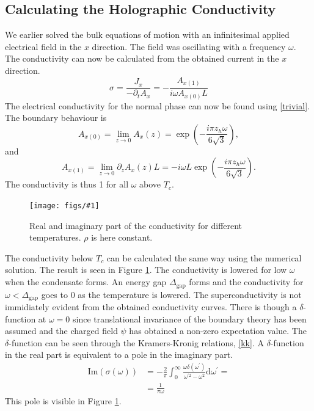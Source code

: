 \documentclass[12pt]{report}
\renewcommand{\d}{\ensuremath{\mathrm{d}}}
\renewcommand{\i}{\ensuremath{i}}
\newcommand{\im}{\ensuremath{\mathrm{Im}}}
\newcommand{\fig}[2]{
\begin{figure}
\centering
\texttt{[image: figs/\#1]}
\caption{#2}
\end{figure}
}
\begin{document}
\subsection{Calculating the Holographic Conductivity}
We earlier solved the bulk equations of motion with an infinitesimal applied electrical field in the $x$ direction. The field was oscillating with a frequency $\omega$. The conductivity can now be calculated from the obtained current in the $x$ direction.
\begin{equation}
 \sigma=\frac{J_x}{-\partial_tA_x}=-\frac{A_{x(1)}}{\i\omega A_{x(0)}L}
\end{equation}
The electrical conductivity for the normal phase can now be found using \eqref{trivial}. The boundary behaviour is
\begin{equation}
    A_{x(0)}=\lim_{z\rightarrow0} A_x(z) =  \exp\left(-\frac{\i\pi z_h\omega}{6\sqrt{3}}\right),                                                                                 
\end{equation}
and
\begin{equation}
    A_{x(1)}=\lim_{z\rightarrow0} \partial_zA_x(z)L   = -\i\omega L\exp\left(-\frac{\i\pi z_h\omega}{6\sqrt{3}}\right).      
\end{equation}
The conductivity is thus 1 for all $\omega$ above $T_c$.\\

\fig{cond_Ts_a2_0.0_v2.pdf}{Real and imaginary part of the conductivity for different temperatures. $\rho$ is here constant.\label{f:cond}}

The conductivity below $T_c$ can be calculated the same way using the numerical solution. The result is seen in Figure \ref{f:cond}. The conductivity is lowered for low $\omega$ when the condensate forms. An energy gap $\Delta_\mathrm{gap}$ forms and the conductivity for $\omega<\Delta_\mathrm{gap}$ goes to 0 as the temperature is lowered. The superconductivity is not immidiately evident from the obtained conductivity curves. There is though a $\delta$-function at $\omega=0$ since translational invariance of the boundary theory has been assumed and the charged field $\psi$ has obtained a non-zero expectation value. The $\delta$-function can be seen through the Kramers-Kronig relations, \eqref{kk}. A $\delta$-function in the real part is equivalent to a pole in the imaginary part.
\begin{equation}
\begin{split}
\im(\sigma(\omega))&=-\frac{2}{\pi}\int_0^\infty\frac{\omega\delta(\omega^\prime)}{\omega^{\prime 2}-\omega^2}\d \omega^\prime=\\
&=\frac{1}{\pi\omega}
\end{split}
\end{equation}
This pole is visible in Figure \ref{f:cond}.
\end{document}
